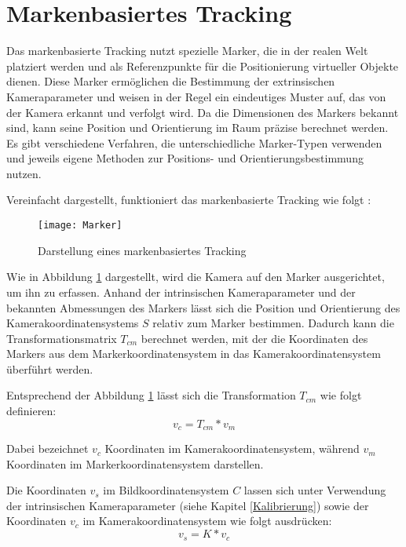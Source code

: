 \section{Markenbasiertes Tracking}\label{Markerbasiertes Tracking}

Das markenbasierte Tracking nutzt spezielle Marker, die in der realen Welt platziert werden und als Referenzpunkte für die Positionierung virtueller Objekte dienen. Diese Marker ermöglichen die Bestimmung der extrinsischen Kameraparameter und weisen in der Regel ein eindeutiges Muster auf, das von der Kamera erkannt und verfolgt wird. Da die Dimensionen des Markers bekannt sind, kann seine Position und Orientierung im Raum präzise berechnet werden. Es gibt verschiedene Verfahren, die unterschiedliche Marker-Typen verwenden und jeweils eigene Methoden zur Positions- und Orientierungsbestimmung nutzen. \cite{doerner2022virtual}

Vereinfacht dargestellt, funktioniert das markenbasierte Tracking wie folgt \cite{doerner2022virtual}:

\begin{figure}
    \centering
    \texttt{[image: Marker]}
    \caption{Darstellung eines markenbasiertes Tracking \cite{doerner2022virtual} \label{fig:Marker}}\par
\end{figure}

Wie in Abbildung \ref{fig:Marker} dargestellt, wird die Kamera auf den Marker ausgerichtet, um ihn zu erfassen. Anhand der intrinsischen Kameraparameter und der bekannten Abmessungen des Markers lässt sich die Position und Orientierung des Kamerakoordinatensystems \( S \) relativ zum Marker bestimmen. Dadurch kann die Transformationsmatrix \( T_{cm} \) berechnet werden, mit der die Koordinaten des Markers aus dem Markerkoordinatensystem in das Kamerakoordinatensystem überführt werden. 

Entsprechend der Abbildung \ref{fig:Marker} lässt sich die Transformation \( T_{cm} \) wie folgt definieren:
\begin{equation}\label{eq:v_c}
    v_c = T_{cm} * v_m
\end{equation}

Dabei bezeichnet \( v_c \) Koordinaten im Kamerakoordinatensystem, während \( v_m \) Koordinaten im Markerkoordinatensystem darstellen.  

Die Koordinaten \( v_s \) im Bildkoordinatensystem \( C \) lassen sich unter Verwendung der intrinsischen Kameraparameter (siehe Kapitel \ref{Kalibrierung}) sowie der Koordinaten \( v_c \) im Kamerakoordinatensystem wie folgt ausdrücken:
\begin{equation}
    v_s = K * v_c
\end{equation}

